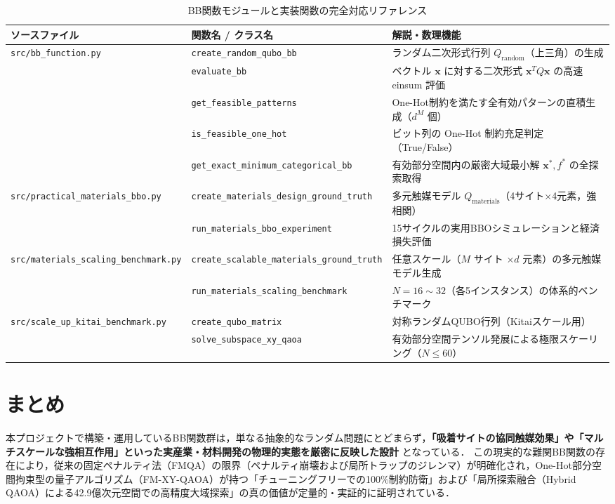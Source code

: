 \documentclass[11pt,a4paper]{ltjsarticle}
\begin{document}
\begin{table}[H]
\centering
\caption{BB関数モジュールと実装関数の完全対応リファレンス}\label{tab:code_mapping}
\vspace{1mm}
\footnotesize
\renewcommand{\arraystretch}{1.2}
\begin{tabularx}{\textwidth}{p{4.4cm} p{6.0cm} X}
\toprule
\textbf{ソースファイル} & \textbf{関数名 / クラス名} & \textbf{解説・数理機能} \\
\midrule
\texttt{src/bb\_function.py} & \texttt{create\_random\_qubo\_bb} & ランダム二次形式行列 $Q_{\mathrm{random}}$（上三角）の生成 \\
& \texttt{evaluate\_bb} & ベクトル $\bm{x}$ に対する二次形式 $\bm{x}^T Q \bm{x}$ の高速 einsum 評価 \\
& \texttt{get\_feasible\_patterns} & One-Hot制約を満たす全有効パターンの直積生成（$d^M$ 個） \\
& \texttt{is\_feasible\_one\_hot} & ビット列の One-Hot 制約充足判定（True/False） \\
& \texttt{get\_exact\_minimum\_categorical\_bb} & 有効部分空間内の厳密大域最小解 $\bm{x}^*, f^*$ の全探索取得 \\
\midrule
\texttt{src/practical\_materials\_bbo.py} & \texttt{create\_materials\_design\_ground\_truth} & 多元触媒モデル $Q_{\mathrm{materials}}$（4サイト×4元素，強相関） \\
& \texttt{run\_materials\_bbo\_experiment} & 15サイクルの実用BBOシミュレーションと経済損失評価 \\
\midrule
\texttt{src/materials\_scaling\_benchmark.py} & \texttt{create\_scalable\_materials\_ground\_truth} & 任意スケール（$M$ サイト $\times d$ 元素）の多元触媒モデル生成 \\
& \texttt{run\_materials\_scaling\_benchmark} & $N=16 \sim 32$（各5インスタンス）の体系的ベンチマーク \\
\midrule
\texttt{src/scale\_up\_kitai\_benchmark.py} & \texttt{create\_qubo\_matrix} & 対称ランダムQUBO行列（Kitaiスケール用） \\
& \texttt{solve\_subspace\_xy\_qaoa} & 有効部分空間テンソル発展による極限スケーリング（$N \le 60$） \\
\bottomrule
\end{tabularx}
\end{table}

\section{まとめ}
\label{sec:conclusion}
本プロジェクトで構築・運用しているBB関数群は，単なる抽象的なランダム問題にとどまらず，\textbf{「吸着サイトの協同触媒効果」や「マルチスケールな強相互作用」といった実産業・材料開発の物理的実態を厳密に反映した設計} となっている．
この現実的な難関BB関数の存在により，従来の固定ペナルティ法（FMQA）の限界（ペナルティ崩壊および局所トラップのジレンマ）が明確化され，One-Hot部分空間拘束型の量子アルゴリズム（FM-XY-QAOA）が持つ「チューニングフリーでの100\%制約防衛」および「局所探索融合（Hybrid QAOA）による42.9億次元空間での高精度大域探索」の真の価値が定量的・実証的に証明されている．
\end{document}
